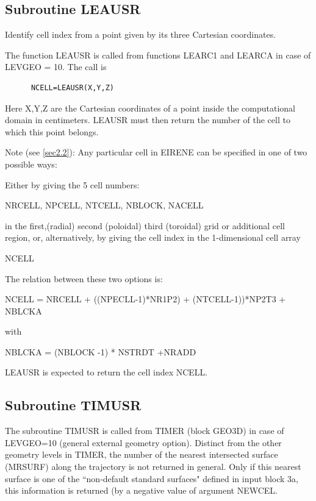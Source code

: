 \subsection{Subroutine LEAUSR}
\label{sec3.8.1}

Identify cell index from a point given by its three Cartesian coordinates.

The function LEAUSR is called from functions LEARC1 and LEARCA in case of
LEVGEO = 10.
The call is 

\begin{lstlisting}
      NCELL=LEAUSR(X,Y,Z)
\end{lstlisting} 

Here X,Y,Z are the Cartesian coordinates of a point inside the computational
domain in centimeters.
LEAUSR must then return the number of the cell to which this point belongs.

Note (see \cref{sec2.2}): Any particular cell in EIRENE can be specified in one
of two possible ways:

Either by giving the 5 cell numbers:

NRCELL, NPCELL, NTCELL, NBLOCK, NACELL 

in the first,(radial) second (poloidal) third (toroidal) grid or additional
cell region, or, alternatively, by giving the cell index in the 1-dimensional
cell array 

NCELL 

\medskip 

The relation between these two options is:

NCELL = NRCELL + ((NPECLL-1)*NR1P2) + (NTCELL-1))*NP2T3 + NBLCKA

with 

NBLCKA = (NBLOCK -1) * NSTRDT +NRADD 

LEAUSR is expected to return the cell index NCELL.

\subsection{Subroutine TIMUSR}
\label{sec3.8.2}

The subroutine TIMUSR is called from TIMER (block GEO3D) in case of LEVGEO=10
(general external geometry option).
Distinct from the other geometry levels in TIMER, the number of the nearest
intersected surface (MRSURF) along the trajectory is not returned in general.
Only if this nearest surface is one of the ``non-default standard surfaces"
defined in input block 3a, this information is returned (by a negative value of
argument NEWCEL.

